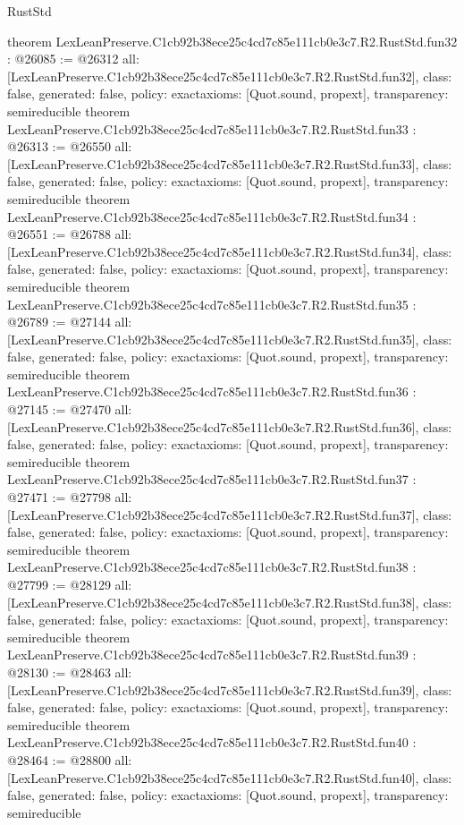 \begin{lexlean}{RustStd}
\begin{coremodule}
{}
theorem LexLeanPreserve.C1cb92b38ece25c4cd7c85e111cb0e3c7.R2.RustStd.fun32 : @26085 := @26312 {
  all: [LexLeanPreserve.C1cb92b38ece25c4cd7c85e111cb0e3c7.R2.RustStd.fun32],
  class: false,
  generated: false,
  policy: exact{axioms: [Quot.sound, propext]},
  transparency: semireducible
}
theorem LexLeanPreserve.C1cb92b38ece25c4cd7c85e111cb0e3c7.R2.RustStd.fun33 : @26313 := @26550 {
  all: [LexLeanPreserve.C1cb92b38ece25c4cd7c85e111cb0e3c7.R2.RustStd.fun33],
  class: false,
  generated: false,
  policy: exact{axioms: [Quot.sound, propext]},
  transparency: semireducible
}
theorem LexLeanPreserve.C1cb92b38ece25c4cd7c85e111cb0e3c7.R2.RustStd.fun34 : @26551 := @26788 {
  all: [LexLeanPreserve.C1cb92b38ece25c4cd7c85e111cb0e3c7.R2.RustStd.fun34],
  class: false,
  generated: false,
  policy: exact{axioms: [Quot.sound, propext]},
  transparency: semireducible
}
theorem LexLeanPreserve.C1cb92b38ece25c4cd7c85e111cb0e3c7.R2.RustStd.fun35 : @26789 := @27144 {
  all: [LexLeanPreserve.C1cb92b38ece25c4cd7c85e111cb0e3c7.R2.RustStd.fun35],
  class: false,
  generated: false,
  policy: exact{axioms: [Quot.sound, propext]},
  transparency: semireducible
}
theorem LexLeanPreserve.C1cb92b38ece25c4cd7c85e111cb0e3c7.R2.RustStd.fun36 : @27145 := @27470 {
  all: [LexLeanPreserve.C1cb92b38ece25c4cd7c85e111cb0e3c7.R2.RustStd.fun36],
  class: false,
  generated: false,
  policy: exact{axioms: [Quot.sound, propext]},
  transparency: semireducible
}
theorem LexLeanPreserve.C1cb92b38ece25c4cd7c85e111cb0e3c7.R2.RustStd.fun37 : @27471 := @27798 {
  all: [LexLeanPreserve.C1cb92b38ece25c4cd7c85e111cb0e3c7.R2.RustStd.fun37],
  class: false,
  generated: false,
  policy: exact{axioms: [Quot.sound, propext]},
  transparency: semireducible
}
theorem LexLeanPreserve.C1cb92b38ece25c4cd7c85e111cb0e3c7.R2.RustStd.fun38 : @27799 := @28129 {
  all: [LexLeanPreserve.C1cb92b38ece25c4cd7c85e111cb0e3c7.R2.RustStd.fun38],
  class: false,
  generated: false,
  policy: exact{axioms: [Quot.sound, propext]},
  transparency: semireducible
}
theorem LexLeanPreserve.C1cb92b38ece25c4cd7c85e111cb0e3c7.R2.RustStd.fun39 : @28130 := @28463 {
  all: [LexLeanPreserve.C1cb92b38ece25c4cd7c85e111cb0e3c7.R2.RustStd.fun39],
  class: false,
  generated: false,
  policy: exact{axioms: [Quot.sound, propext]},
  transparency: semireducible
}
theorem LexLeanPreserve.C1cb92b38ece25c4cd7c85e111cb0e3c7.R2.RustStd.fun40 : @28464 := @28800 {
  all: [LexLeanPreserve.C1cb92b38ece25c4cd7c85e111cb0e3c7.R2.RustStd.fun40],
  class: false,
  generated: false,
  policy: exact{axioms: [Quot.sound, propext]},
  transparency: semireducible
}
\end{coremodule}
\end{lexlean}
